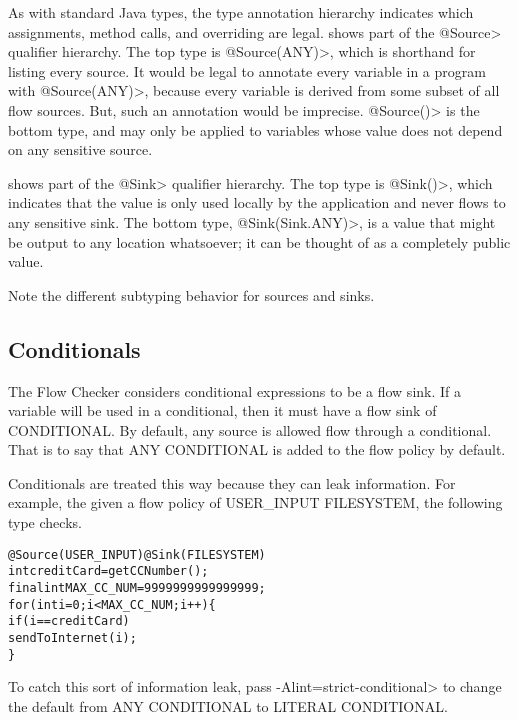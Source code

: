 As with standard Java types, the type annotation hierarchy indicates which
assignments, method calls, and overriding are legal.  
shows part of the \<@Source>
qualifier hierarchy.  The top type is \<@Source(ANY)>, which is
shorthand for listing every source.  It would be legal to annotate every
variable in a program with \<@Source(ANY)>, because every variable is
derived from some subset of all flow sources.  But, such an annotation
would be imprecise.  \<@Source(\ttcbs)>  is the
bottom type, and may only
be applied to variables whose value does not depend on any sensitive
source.


 shows part of the \<@Sink>
qualifier hierarchy.  The top type is \<@Sink(\ttcbs)>, which indicates
that the value is only used locally by the application and never flows to
any sensitive sink.  The bottom type, \<@Sink(Sink.ANY)>, is a
value that might be output to any location whatsoever; it can be thought of
as a completely public value.

Note the different subtyping behavior for sources and sinks.




\subsection{Conditionals\label{sec:conditionals}}

The Flow Checker considers conditional expressions to be a flow sink.  If a variable 
will be used in a conditional, then it must have a flow sink of CONDITIONAL.  By default, 
any source is allowed flow through a conditional.  That is to say that 
ANY \flowsto{} CONDITIONAL is added to the flow policy by default. 

Conditionals are treated this way because they can leak information. For example, the given a flow policy of  USER\_INPUT \flowsto{} FILESYSTEM, the following type checks.

\begin{alltt}
@Source(USER_INPUT) @Sink(FILESYSTEM)
int creditCard = getCCNumber();
final int MAX\_CC\_NUM = 9999999999999999;
for (int i = 0 ; i < MAX\_CC\_NUM ; i++)\{
   if (i == creditCard)
        sendToInternet(i);
\}
\end{alltt}

To catch this sort of information leak, pass
 \<-Alint=strict-conditional> to change the default from ANY \flowsto{} CONDITIONAL to 
 LITERAL \flowsto{} CONDITIONAL. 



